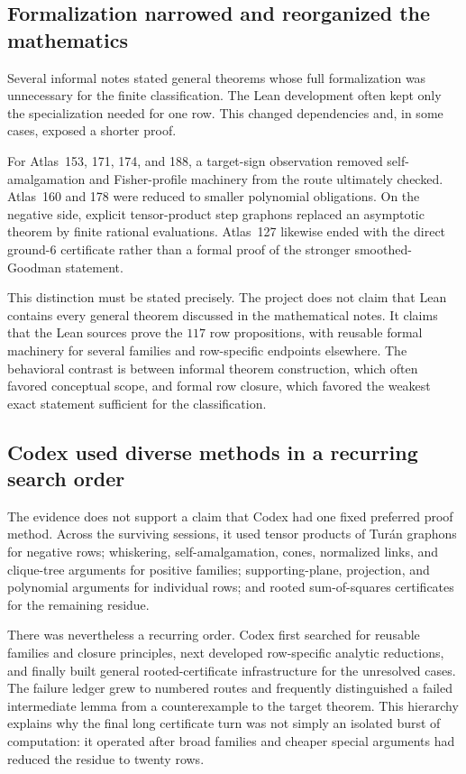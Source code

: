 \documentclass[11pt]{article}
\begin{document}
\subsection{Formalization narrowed and reorganized the mathematics}
\label{sec:refactoring}

Several informal notes stated general theorems whose full formalization was
unnecessary for the finite classification.  The Lean development often kept
only the specialization needed for one row.  This changed dependencies and,
in some cases, exposed a shorter proof.

For Atlas~153, 171, 174, and 188, a target-sign observation removed
self-amalgamation and Fisher-profile machinery from the route ultimately
checked.  Atlas~160 and 178 were reduced to smaller polynomial obligations.
On the negative side, explicit tensor-product step graphons replaced an
asymptotic theorem by finite rational evaluations.  Atlas~127 likewise ended
with the direct ground-$6$ certificate rather than a formal proof of the
stronger smoothed-Goodman statement.

This distinction must be stated precisely.  The project does not claim that
Lean contains every general theorem discussed in the mathematical notes.  It
claims that the Lean sources prove the $117$ row propositions, with reusable
formal machinery for several families and row-specific endpoints elsewhere.
The behavioral contrast is between informal theorem construction, which often
favored conceptual scope, and formal row closure, which favored the weakest
exact statement sufficient for the classification.

\subsection{Codex used diverse methods in a recurring search order}
\label{sec:breadth}

The evidence does not support a claim that Codex had one fixed preferred proof
method.  Across the surviving sessions, it used tensor products of Tur\'an
graphons for negative rows; whiskering, self-amalgamation, cones, normalized
links, and clique-tree arguments for positive families; supporting-plane,
projection, and polynomial arguments for individual rows; and rooted
sum-of-squares certificates for the remaining residue.

There was nevertheless a recurring order.  Codex first searched for reusable
families and closure principles, next developed row-specific analytic
reductions, and finally built general rooted-certificate infrastructure for
the unresolved cases.  The failure ledger grew to \FailedRoutes{} numbered
routes and frequently distinguished a failed intermediate lemma from a
counterexample to the target theorem.  This hierarchy explains why the final
long certificate turn was not simply an isolated burst of computation: it
operated after broad families and cheaper special arguments had reduced the
residue to twenty rows.
\end{document}
